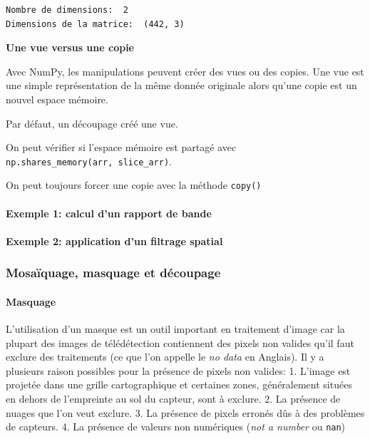 \documentclass[11pt]{article}
\begin{document}
    \begin{Verbatim}[commandchars=\\\{\}]
Nombre de dimensions:  2
Dimensions de la matrice:  (442, 3)
    \end{Verbatim}

    \textbf{Une vue versus une copie}

Avec NumPy, les manipulations peuvent créer des vues ou des copies. Une
vue est une simple représentation de la même donnée originale alors
qu'une copie est un nouvel espace mémoire.

Par défaut, un découpage créé une vue.

On peut vérifier si l'espace mémoire est partagé avec
\texttt{np.shares\_memory(arr,\ slice\_arr)}.

On peut toujours forcer une copie avec la méthode \texttt{copy()}

\hypertarget{exemple-1-calcul-dun-rapport-de-bande}{%
\paragraph{Exemple 1: calcul d'un rapport de
bande}\label{exemple-1-calcul-dun-rapport-de-bande}}

\hypertarget{exemple-2-application-dun-filtrage-spatial}{%
\paragraph{Exemple 2: application d'un filtrage
spatial}\label{exemple-2-application-dun-filtrage-spatial}}

\hypertarget{mosauxefquage-masquage-et-duxe9coupage}{%
\subsubsection{Mosaïquage, masquage et
découpage}\label{mosauxefquage-masquage-et-duxe9coupage}}

\hypertarget{masquage}{%
\paragraph{Masquage}\label{masquage}}

L'utilisation d'un masque est un outil important en traitement d'image
car la plupart des images de télédétection contiennent des pixels non
valides qu'il faut exclure des traitements (ce que l'on appelle le
\emph{no data} en Anglais). Il y a plusieurs raison possibles pour la
présence de pixels non valides: 1. L'image est projetée dans une grille
cartographique et certaines zones, généralement situées en dehors de
l'empreinte au sol du capteur, sont à exclure. 2. La présence de nuages
que l'on veut exclure. 3. La présence de pixels erronés dûs à des
problèmes de capteurs. 4. La présence de valeurs non numériques
(\emph{not a number} ou \texttt{nan})
\end{document}
